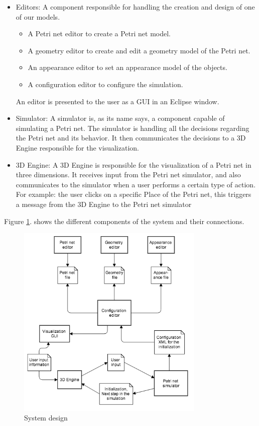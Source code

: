 \begin{itemize}
  \item Editors: A component responsible for handling the creation and design of one of our models. 
	\begin{itemize}
	 \item A Petri net editor to create a Petri net model.
	 \item A geometry editor to create and edit a geometry model of the Petri net.
	 \item An appearance editor to set an appearance model of the objects.
	 \item A configuration editor to configure the simulation.
	 \end{itemize}
	An editor is presented to the user as a GUI in an Eclipse window.
  \item Simulator: A simulator is, as its name says, a component capable of simulating a Petri net.
	The simulator is handling all the decisions regarding the Petri net and its behavior. 
	It then communicates the decisions to a 3D Engine responsible for the visualization.
  \item 3D Engine: A 3D Engine is responsible for the visualization of a Petri net in three dimensions.
	It receives input from the Petri net simulator, and also communicates to the simulator when a user performs a certain type of action. \newline
	For example: the user clicks on a specific Place of the Petri net, this triggers a message from the 3D Engine to the Petri net simulator 
\end{itemize}

Figure \ref{fig:system_diagram}. shows the different components of the system and their connections.

\begin{figure}[htp]
\begin{center}
  \includegraphics[width=0.8\textwidth]{image/system_design.png}
  \caption{System design}
  \label{fig:system_diagram}
\end{center}
\end{figure}

